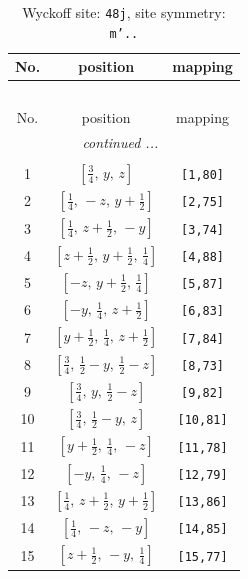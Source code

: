 \documentclass[fleqn,8pt]{jsarticle}
\begin{document}
\begin{longtable}{ccc}
\caption{Wyckoff site: {\tt 48j}, site symmetry: {\tt m'..}}
 \\
 \hline \hline
No. & position & mapping \\ \hline \endfirsthead

\multicolumn{2}{l}{\tablename\ \thetable{}} \\
 \hline \hline
No. & position & mapping \\ \hline \endhead

 \hline \hline
\multicolumn{2}{r}{\footnotesize\it continued ...} \\ \endfoot

 \hline \hline
\multicolumn{2}{r}{} \\ \endlastfoot

1 & $\left[ \frac{3}{4},\, y,\, z \right]$ & {\tt [1,80]} \\ \hline
2 & $\left[ \frac{1}{4},\, - z,\, y + \frac{1}{2} \right]$ & {\tt [2,75]} \\ \hline
3 & $\left[ \frac{1}{4},\, z + \frac{1}{2},\, - y \right]$ & {\tt [3,74]} \\ \hline
4 & $\left[ z + \frac{1}{2},\, y + \frac{1}{2},\, \frac{1}{4} \right]$ & {\tt [4,88]} \\ \hline
5 & $\left[ - z,\, y + \frac{1}{2},\, \frac{1}{4} \right]$ & {\tt [5,87]} \\ \hline
6 & $\left[ - y,\, \frac{1}{4},\, z + \frac{1}{2} \right]$ & {\tt [6,83]} \\ \hline
7 & $\left[ y + \frac{1}{2},\, \frac{1}{4},\, z + \frac{1}{2} \right]$ & {\tt [7,84]} \\ \hline
8 & $\left[ \frac{3}{4},\, \frac{1}{2} - y,\, \frac{1}{2} - z \right]$ & {\tt [8,73]} \\ \hline
9 & $\left[ \frac{3}{4},\, y,\, \frac{1}{2} - z \right]$ & {\tt [9,82]} \\ \hline
10 & $\left[ \frac{3}{4},\, \frac{1}{2} - y,\, z \right]$ & {\tt [10,81]} \\ \hline
11 & $\left[ y + \frac{1}{2},\, \frac{1}{4},\, - z \right]$ & {\tt [11,78]} \\ \hline
12 & $\left[ - y,\, \frac{1}{4},\, - z \right]$ & {\tt [12,79]} \\ \hline
13 & $\left[ \frac{1}{4},\, z + \frac{1}{2},\, y + \frac{1}{2} \right]$ & {\tt [13,86]} \\ \hline
14 & $\left[ \frac{1}{4},\, - z,\, - y \right]$ & {\tt [14,85]} \\ \hline
15 & $\left[ z + \frac{1}{2},\, - y,\, \frac{1}{4} \right]$ & {\tt [15,77]} \\ \hline

\end{longtable}
\end{document}
